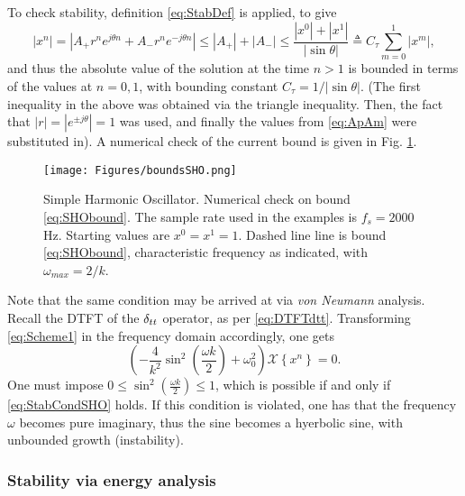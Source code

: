 To check stability, definition \eqref{eq:StabDef} is applied, to give
\begin{equation}\label{eq:SHObound} 
    |x^n| = |A_+ r^n e^{j \theta n} + A_- r^n e^{-j \theta n}| \leq |A_+| + |A_-| \leq \frac{|x^0|+|x^1|}{|\sin \theta|} \triangleq C_\tau \sum_{m=0}^1 |x^m|,
\end{equation}
and thus the absolute value of the solution at the time $n>1$ is bounded in terms of the values at $n=0,1$, with bounding constant $C_\tau = 1/|\sin\theta|$. (The first inequality in the above was obtained via the triangle inequality. Then, the fact that $|r|=|e^{\pm j\theta}|=1$ was used, and finally the values from \eqref{eq:ApAm} were substituted in). A numerical check of the current bound is given in Fig. \ref{fig:SHObounds}.
\begin{figure}
    \texttt{[image: Figures/boundsSHO.png]}
    \caption{Simple Harmonic Oscillator. Numerical check on bound \eqref{eq:SHObound}. The sample rate used in the examples is $f_s = 2000$ Hz. Starting values are $x^0 = x^1 = 1$. Dashed line line is bound \eqref{eq:SHObound}, characteristic frequency as indicated, with $\omega_{max}=2/k$.}\label{fig:SHObounds}
\end{figure}
Note that the same condition may be arrived at via \emph{von Neumann} analysis. Recall the DTFT of the $\delta_{tt}$ operator, as per \eqref{eq:DTFTdtt}. Transforming \eqref{eq:Scheme1} in the frequency domain accordingly, one gets
\begin{equation}
\left(-\frac{4}{k^2}\sin^2\left( \frac{\omega k}{2}\right) + \omega_0^2\right)\mathcal{X}\left\{ x^n\right\} = 0.
\end{equation}
One must impose  $0 \leq \sin^2\left( \frac{\omega k}{2}\right) \leq 1$, which is possible if and only if \eqref{eq:StabCondSHO} holds. If this condition is violated, one has that the frequency $\omega$ becomes pure imaginary, thus the sine becomes a hyerbolic sine, with unbounded growth (instability).




\subsubsection{Stability via energy analysis}



